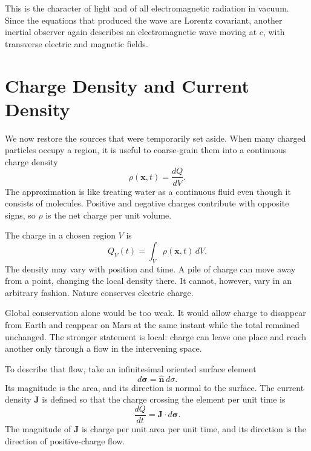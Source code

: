 This is the character of light and of all electromagnetic radiation in vacuum. Since the equations that produced the wave are Lorentz covariant, another inertial observer again describes an electromagnetic wave moving at \(c\), with transverse electric and magnetic fields.

\section{Charge Density and Current Density}

We now restore the sources that were temporarily set aside. When many charged particles occupy a region, it is useful to coarse-grain them into a continuous charge density
\begin{equation}
\rho(\mathbf x,t)=\frac{dQ}{dV}.
\end{equation}
The approximation is like treating water as a continuous fluid even though it consists of molecules. Positive and negative charges contribute with opposite signs, so \(\rho\) is the net charge per unit volume.

The charge in a chosen region \(V\) is
\begin{equation}
Q_V(t)=\int_V\rho(\mathbf x,t)\,dV.
\label{eq:charge-volume}
\end{equation}
The density may vary with position and time. A pile of charge can move away from a point, changing the local density there. It cannot, however, vary in an arbitrary fashion. Nature conserves electric charge.

Global conservation alone would be too weak. It would allow charge to disappear from Earth and reappear on Mars at the same instant while the total remained unchanged. The stronger statement is local: charge can leave one place and reach another only through a flow in the intervening space.

To describe that flow, take an infinitesimal oriented surface element
\begin{equation}
d\boldsymbol\sigma=\widehat{\mathbf n}\,d\sigma.
\end{equation}
Its magnitude is the area, and its direction is normal to the surface. The current density \(\mathbf J\) is defined so that the charge crossing the element per unit time is
\begin{equation}
\frac{dQ}{dt}=\mathbf J\cdot d\boldsymbol\sigma.
\label{eq:current-flux-element}
\end{equation}
The magnitude of \(\mathbf J\) is charge per unit area per unit time, and its direction is the direction of positive-charge flow.

